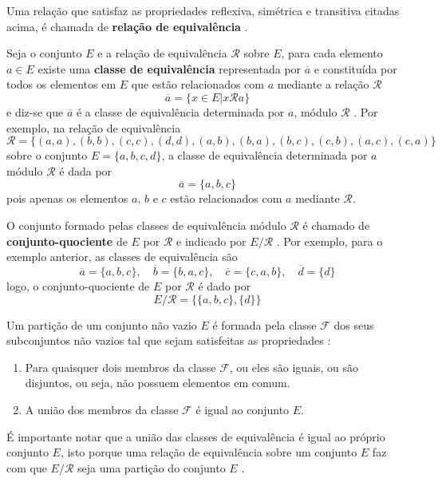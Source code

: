 Uma relação que satisfaz as propriedades reflexiva, simétrica e transitiva citadas acima, é chamada de \textbf{relação de equivalência} \cite{Domingues:2003}.

Seja o conjunto \(E\) e a relação de equivalência \(\mathcal{R}\) sobre \(E\), para cada elemento \(a \in E\) existe uma \textbf{classe de equivalência} representada por \(\overline{a}\) e constituída por todos os elementos em \(E\) que estão relacionados com \(a\) mediante a relação \(\mathcal{R}\)
$$
  \overline{a} = \{x \in E | x \mathcal{R} a \}
$$
e diz-se que \(\overline{a}\) é a classe de equivalência determinada por \(a\), módulo \(\mathcal{R}\) \cite{Domingues:2003}. Por exemplo, na relação de equivalência 
$$
\mathcal{R} = \{(a, a), (b, b), (c, c), (d, d), (a, b), (b, a), (b, c), (c, b), (a, c), (c, a)\}
$$
sobre o conjunto \(E = \{a, b, c, d\}\), a classe de equivalência determinada por \(a\) módulo \(\mathcal{R}\) é dada por
$$
  \overline{a} = \{a, b, c\}
$$
pois apenas os elementos \(a\), \(b\) e \(c\) estão relacionados com \(a\) mediante \(\mathcal{R}\).

O conjunto formado pelas classes de equivalência módulo \(\mathcal{R}\) é chamado de \textbf{conjunto-quociente} de \(E\) por \(\mathcal{R}\) e indicado por \(E/\mathcal{R}\) \cite{Domingues:2003}. Por exemplo, para o exemplo anterior, as classes de equivalência são
$$
  \overline{a} = \{a, b, c\}, \quad
  \overline{b} = \{b, a, c\}, \quad
  \overline{c} = \{c, a, b\}, \quad
  \overline{d} = \{d\}
$$
logo, o conjunto-quociente de \(E\) por \(\mathcal{R}\) é dado por
$$
  E/\mathcal{R} = \{\{a, b, c\}, \{d\}\}
$$

Um partição de um conjunto não vazio \(E\) é formada pela classe \(\mathcal{F}\) dos seus subconjuntos não vazios tal que sejam satisfeitas as propriedades \cite{Domingues:2003}:
\begin{enumerate}
  \item Para quaisquer dois membros da classe \(\mathcal{F}\), ou eles são iguais, ou são disjuntos, ou seja, não possuem elementos em comum.
  \item A união dos membros da classe \(\mathcal{F}\) é igual ao conjunto \(E\).
\end{enumerate}

É importante notar que a união das classes de equivalência é igual ao próprio conjunto \(E\), isto porque uma relação de equivalência sobre um conjunto \(E\) faz com que \(E/\mathcal{R}\) seja uma partição do conjunto \(E\) \cite{Domingues:2003}.

